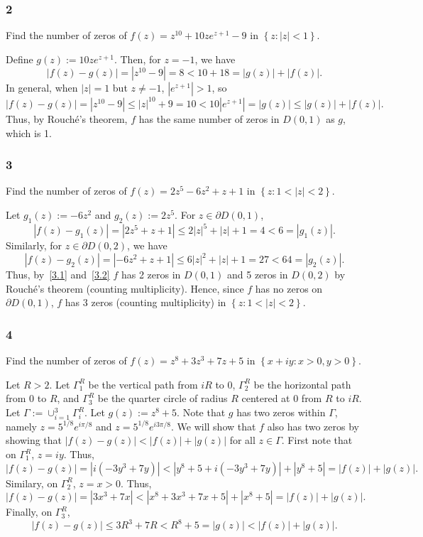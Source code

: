 \documentclass[12pt]{article}
\begin{document}
\newpage
\subsubsection*{2}
\begin{tcolorbox}
  Find the number of zeros of $f(z) = z^{10} + 10ze^{z + 1} - 9$ in $\left\{ z : |z| < 1 \right\}$.
\end{tcolorbox}
Define $g(z) := 10ze^{z+1}$. Then, for $z = -1$, we have
\[ |f(z) - g(z)| = |z^{10} - 9| = 8 < 10 + 18 = |g(z)| + |f(z)|. \]
In general, when $|z| = 1$ but $z \neq -1$, $|e^{z + 1}| > 1$, so
\[ |f(z) - g(z)| = |z^{10} - 9| \leq |z|^{10} + 9 = 10 < 10|e^{z+1}| = |g(z)| \leq |g(z)| + |f(z)|. \]
Thus, by Rouch\'{e}'s theorem, $f$ has the same number of zeros in $D(0,1)$ as $g$, which is 1.

\subsubsection*{3}
\begin{tcolorbox}
  Find the number of zeros of $f(z) = 2z^5 - 6z^2 + z + 1$ in $\left\{ z : 1 < |z| < 2 \right\}$.
\end{tcolorbox}
Let $g_1(z) := -6z^2$ and $g_2(z) := 2z^5$. For $z \in \partial D(0,1)$,
\begin{equation}
  |f(z) - g_1(z)| = |2z^5 + z + 1| \leq 2|z|^5 + |z| + 1 = 4 < 6 = |g_1(z)|.
  \label{3.1}
\end{equation}
Similarly, for $z \in \partial D(0,2)$, we have 
\begin{equation}
  |f(z) - g_2(z)| = |-6z^2 + z + 1| \leq 6|z|^2 + |z| + 1 = 27 < 64 = |g_2(z)|.
  \label{3.2}
\end{equation}
Thus, by~\eqref{3.1} and~\eqref{3.2} $f$ has 2 zeros in $D(0,1)$ and 5 zeros in $D(0,2)$ by Rouch\'{e}'s theorem (counting multiplicity). Hence, since
$f$ has no zeros on $\partial D(0,1)$, $f$ has 3 zeros (counting multiplicity) in $\left\{ z : 1 < |z| < 2 \right\}$.


\subsubsection*{4}
\begin{tcolorbox}
  Find the number of zeros of $f(z) = z^8 + 3z^3 + 7z + 5$ in $\left\{ x + iy : x > 0, y > 0 \right\}$.
\end{tcolorbox}
Let $R > 2$. Let $\Gamma_{1}^{R}$ be the vertical path from $iR$ to $0$, $\Gamma_{2}^{R}$ be the horizontal path from $0$ to $R$, and $\Gamma_{3}^{R}$
be the quarter circle of radius $R$ centered at $0$ from $R$ to $iR$. Let $\Gamma := \cup_{i=1}^{3}\Gamma_{i}^{R}$.
Let $g(z) := z^{8} + 5$. Note that $g$ has two zeros within $\Gamma$, namely $z = 5^{1/8}e^{i\pi/8}$ and $z = 5^{1/8}e^{i3\pi/8}$. We will show that
$f$ also has two zeros by showing that $|f(z) - g(z)| < |f(z)| + |g(z)|$ for all $z \in \Gamma$. First note that on $\Gamma_{1}^{R}$, $z = iy$. Thus,
\[ |f(z) - g(z)| = |i(-3y^{3} + 7y)| < |y^{8} + 5 + i(-3y^{3} + 7y)| + |y^{8} + 5| = |f(z)| + |g(z)|. \]
Similary, on $\Gamma_{2}^{R}$, $z = x > 0$. Thus,
\[ |f(z) - g(z)| = |3x^{3} + 7x| < |x^{8} + 3x^{3} + 7x + 5| + |x^{8} + 5| = |f(z)| + |g(z)|. \]
Finally, on $\Gamma_{3}^{R}$,
\[ |f(z) - g(z)| \leq 3R^{3} + 7R < R^{8} + 5 = |g(z)| < |f(z)| + |g(z)|. \]
\end{document}
